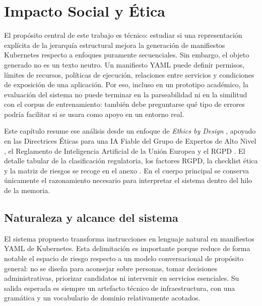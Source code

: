 %
\chapter{Impacto Social y Ética}
\label{ch::chapter9}

El propósito central de este trabajo es técnico: estudiar si una representación explícita de
la jerarquía estructural mejora la generación de manifiestos Kubernetes respecto a enfoques
puramente secuenciales. Sin embargo, el objeto generado no es un texto neutro. Un manifiesto
YAML puede definir permisos, límites de recursos, políticas de ejecución, relaciones entre
servicios y condiciones de exposición de una aplicación. Por eso, incluso en un prototipo
académico, la evaluación del sistema no puede terminar en la parseabilidad ni en la similitud
con el corpus de entrenamiento: también debe preguntarse qué tipo de errores podría facilitar
si se usara como apoyo en un entorno real.

Este capítulo resume ese análisis desde un enfoque de \textit{Ethics by Design}
\citep{ec2021ethics}, apoyado en las Directrices Éticas para una IA Fiable del Grupo de
Expertos de Alto Nivel \citep{aihleg2019}, el Reglamento de Inteligencia Artificial de la Unión
Europea \citep{aiact2024} y el RGPD \citep{rgpd2016}. El detalle tabular de la clasificación
regulatoria, los factores RGPD, la checklist ética y la matriz de riesgos se recoge en el
anexo . En el cuerpo principal se conserva únicamente el razonamiento
necesario para interpretar el sistema dentro del hilo de la memoria.


\section{Naturaleza y alcance del sistema}
\label{sec:ch8_context}

El sistema propuesto transforma instrucciones en lenguaje natural en manifiestos YAML de
Kubernetes. Esta delimitación es importante porque reduce de forma notable el espacio de
riesgo respecto a un modelo conversacional de propósito general: no se diseña para aconsejar
sobre personas, tomar decisiones administrativas, priorizar candidatos ni intervenir en
servicios esenciales. Su salida esperada es siempre un artefacto técnico de infraestructura,
con una gramática y un vocabulario de dominio relativamente acotados.

